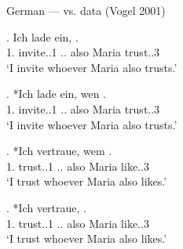 \documentclass[xcolor=dvipsnames,10pt]{beamer}
\begin{document}
\begin{frame}{German ---  vs.  data (Vogel 2001)}

\exg. Ich {lade ein},    . \\
1.{} invite..1\textcolor{LimeGreen}{\scsub{[acc]}} ..\textcolor{red}{} also Maria{} trust..3\textcolor{red}{\scsub{[dat]}}\\
`I invite whoever Maria also trusts.'

\pause

\exg. *Ich {lade ein}, wen   . \\
1.{} invite..1\textcolor{LimeGreen}{\scsub{[acc]}} ..\textcolor{LimeGreen}{} also Maria{} trust..3\textcolor{red}{\scsub{[dat]}}\\
`I invite whoever Maria also trusts.'

\pause

\exg. *Ich vertraue, wem   . \\
1.{} trust..1\textcolor{red}{\scsub{[dat]}} ..\textcolor{red}{} also Maria{} like..3\textcolor{LimeGreen}{\scsub{[acc]}}\\
`I trust whoever Maria also likes.'

\pause

\exg. *Ich vertraue,    . \\
1.{} trust..1\textcolor{red}{\scsub{[dat]}} ..\textcolor{LimeGreen}{} also Maria{} like..3\textcolor{LimeGreen}{\scsub{[acc]}}\\
`I trust whoever Maria also likes.'

\end{frame}
\end{document}
